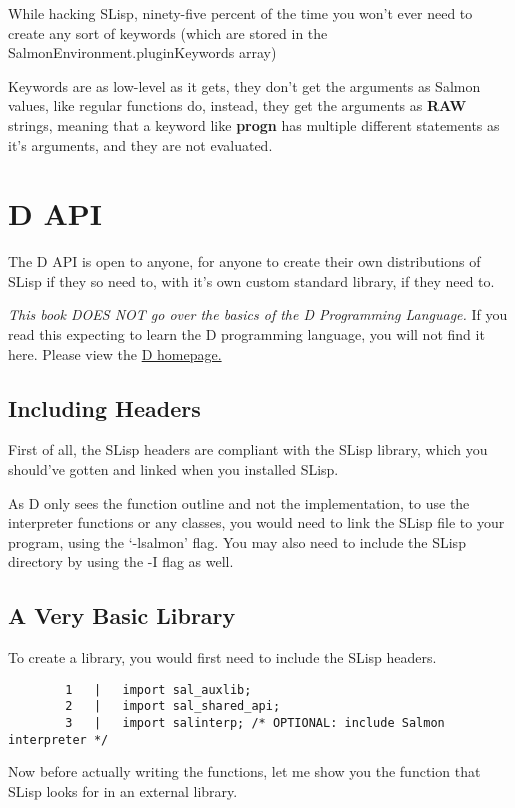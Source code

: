 \documentclass{article}
\begin{document}
	While hacking SLisp, ninety-five percent of the time you won't ever need to create any sort of keywords (which are stored in the SalmonEnvironment.pluginKeywords array)
	
	Keywords are as low-level as it gets, they don't get the arguments as Salmon values, like regular functions do, instead, they get the arguments as \textbf{RAW} strings, meaning that a keyword like \textbf{progn} has multiple different statements as it's arguments, and they are not evaluated.
	
	\section{D API}
	
	The D API is open to anyone, for anyone to create their own distributions of SLisp if they so need to, with it's own custom standard library, if they need to.
	
	\emph{This book DOES NOT go over the basics of the D Programming Language.} If you read this expecting to learn the D programming language, you will not find it here. Please view the \href{https://dlang.org}{D homepage.}
	
	\subsection{Including Headers}
	First of all, the SLisp headers are compliant with the SLisp library, which you should've gotten and linked when you installed SLisp.
	
	As D only sees the function outline and not the implementation, to use the interpreter functions or any classes, you would need to link the SLisp file to your program, using the `-lsalmon' flag. You may also need to include the SLisp directory by using the -I flag as well.
	\subsection{A Very Basic Library}
	To create a library, you would first need to include the SLisp headers.
	
	\begin{lstlisting}
		1   |	import sal_auxlib;
		2   |	import sal_shared_api;
		3   |	import salinterp; /* OPTIONAL: include Salmon interpreter */
	\end{lstlisting}

	Now before actually writing the functions, let me show you the function that SLisp looks for in an external library.
	
\end{document}
